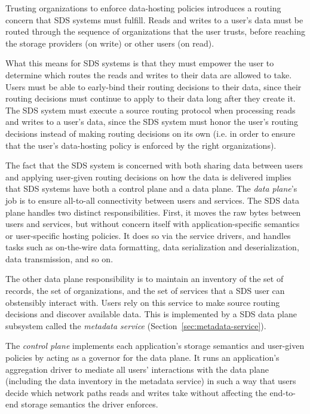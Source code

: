 Trusting organizations to enforce data-hosting policies introduces a routing
concern that SDS systems must fulfill.  Reads and writes to a user's data
must be routed through the sequence of organizations that the user trusts,
before reaching the storage providers (on write) or other users (on read).

What this means for SDS systems is that they must empower the user to determine
which routes the reads and writes to their data are allowed to take.  Users 
must be able to early-bind their routing decisions to their data, since their
routing decisions must continue to apply to their
data long after they create it.  The SDS system must execute a 
source routing protocol when processing reads and writes to a user's data, since
the SDS system must honor the user's routing decisions instead of making routing
decisions on its own (i.e. in order to ensure that the user's data-hosting
policy is enforced by the right organizations).

The fact that the SDS system is concerned with both sharing data between users
and applying user-given routing decisions on how the data is delivered implies
that SDS systems have both a control plane and a data plane.
The \emph{data plane}'s job
is to ensure all-to-all connectivity between users and services.
The SDS data plane handles two distinct responsibilities.  First, it moves the
raw bytes between users and services, but without concern itself with application-specific semantics or
user-specific hosting policies.  It does so via the 
service drivers, and handles tasks such as
on-the-wire data formatting, data serialization and deserialization, data
transmission, and so on.

The other data plane responsibility is to maintain an inventory of the
set of records, the set of organizations, and the set of services that a SDS
user can obstensibly interact with.  Users rely on this service to 
make source routing decisions and discover available data.
This is implemented by a SDS data plane
subsystem called the \emph{metadata service}
(Section~\ref{sec:metadata-service}).

The \emph{control plane} implements each application's
storage semantics and user-given policies by acting as a governor for the data plane.
It runs an application's aggregation driver 
to mediate all users' interactions with the data plane (including the data
inventory in the metadata service) in such a way that
users decide which network paths reads and writes take without 
affecting the end-to-end storage semantics the driver enforces.

